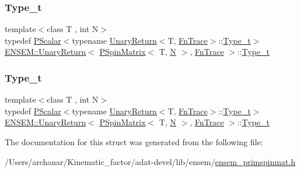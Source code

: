 \subsubsection{\texorpdfstring{Type\_t}{Type\_t}\hspace{0.1cm}{\footnotesize\ttfamily [2/3]}}
{\footnotesize\ttfamily template$<$class T , int N$>$ \\
typedef \mbox{\hyperlink{classENSEM_1_1PScalar}{P\+Scalar}}$<$typename \mbox{\hyperlink{structENSEM_1_1UnaryReturn}{Unary\+Return}}$<$T, \mbox{\hyperlink{structENSEM_1_1FnTrace}{Fn\+Trace}}$>$\+::\mbox{\hyperlink{structENSEM_1_1UnaryReturn_3_01PSpinMatrix_3_01T_00_01N_01_4_00_01FnTrace_01_4_a63cfdcd3d97470a7ba1f1a5108db767d}{Type\+\_\+t}}$>$ \mbox{\hyperlink{structENSEM_1_1UnaryReturn}{E\+N\+S\+E\+M\+::\+Unary\+Return}}$<$ \mbox{\hyperlink{classENSEM_1_1PSpinMatrix}{P\+Spin\+Matrix}}$<$ T, \mbox{\hyperlink{adat__devel_2lib_2hadron_2operator__name__util_8cc_a7722c8ecbb62d99aee7ce68b1752f337}{N}} $>$, \mbox{\hyperlink{structENSEM_1_1FnTrace}{Fn\+Trace}} $>$\+::\mbox{\hyperlink{structENSEM_1_1UnaryReturn_3_01PSpinMatrix_3_01T_00_01N_01_4_00_01FnTrace_01_4_a63cfdcd3d97470a7ba1f1a5108db767d}{Type\+\_\+t}}}

\mbox{\label{structENSEM_1_1UnaryReturn_3_01PSpinMatrix_3_01T_00_01N_01_4_00_01FnTrace_01_4_a63cfdcd3d97470a7ba1f1a5108db767d}} 
\subsubsection{\texorpdfstring{Type\_t}{Type\_t}\hspace{0.1cm}{\footnotesize\ttfamily [3/3]}}
{\footnotesize\ttfamily template$<$class T , int N$>$ \\
typedef \mbox{\hyperlink{classENSEM_1_1PScalar}{P\+Scalar}}$<$typename \mbox{\hyperlink{structENSEM_1_1UnaryReturn}{Unary\+Return}}$<$T, \mbox{\hyperlink{structENSEM_1_1FnTrace}{Fn\+Trace}}$>$\+::\mbox{\hyperlink{structENSEM_1_1UnaryReturn_3_01PSpinMatrix_3_01T_00_01N_01_4_00_01FnTrace_01_4_a63cfdcd3d97470a7ba1f1a5108db767d}{Type\+\_\+t}}$>$ \mbox{\hyperlink{structENSEM_1_1UnaryReturn}{E\+N\+S\+E\+M\+::\+Unary\+Return}}$<$ \mbox{\hyperlink{classENSEM_1_1PSpinMatrix}{P\+Spin\+Matrix}}$<$ T, \mbox{\hyperlink{adat__devel_2lib_2hadron_2operator__name__util_8cc_a7722c8ecbb62d99aee7ce68b1752f337}{N}} $>$, \mbox{\hyperlink{structENSEM_1_1FnTrace}{Fn\+Trace}} $>$\+::\mbox{\hyperlink{structENSEM_1_1UnaryReturn_3_01PSpinMatrix_3_01T_00_01N_01_4_00_01FnTrace_01_4_a63cfdcd3d97470a7ba1f1a5108db767d}{Type\+\_\+t}}}



The documentation for this struct was generated from the following file\+:\begin{DoxyCompactItemize}
\item 
/\+Users/archanar/\+Kinematic\+\_\+factor/adat-\/devel/lib/ensem/\mbox{\hyperlink{adat-devel_2lib_2ensem_2ensem__primspinmat_8h}{ensem\+\_\+primspinmat.\+h}}\end{DoxyCompactItemize}
